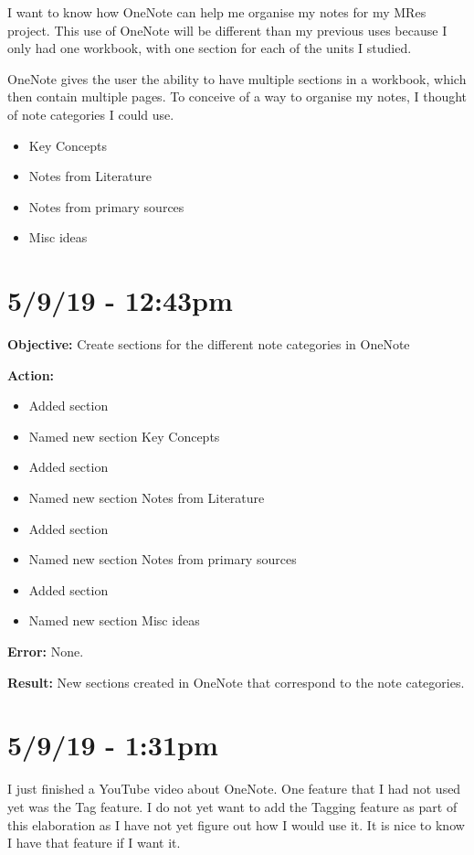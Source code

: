 \documentclass{article}
\begin{document}
I want to know how OneNote can help me organise my notes for my MRes project. This use of OneNote will be different than my previous uses because I only had one workbook, with one section for each of the units I studied.

OneNote gives the user the ability to have multiple sections in a workbook, which then contain multiple pages. To conceive of a way to organise my notes, I thought of note categories I could use.

\begin{itemize}
    \item Key Concepts
    \item Notes from Literature
    \item Notes from primary sources
    \item Misc ideas
\end{itemize}

\section*{5/9/19 - 12:43pm}

\textbf{Objective:} Create sections for the different note categories in OneNote

\textbf{Action:}

\begin{itemize}
    \item Added section
    \item Named new section Key Concepts
    \item Added section
    \item Named new section Notes from Literature
    \item Added section
    \item Named new section Notes from primary sources
    \item Added section
    \item Named new section Misc ideas
\end{itemize}

\textbf{Error:} None.

\textbf{Result:} New sections created in OneNote that correspond to the note categories.

\section*{5/9/19 - 1:31pm}

I just finished a YouTube video about OneNote. One feature that I had not used yet was the Tag feature. I do not yet want to add the Tagging feature as part of this elaboration as I have not yet figure out how I would use it. It is nice to know I have that feature if I want it.
\end{document}
